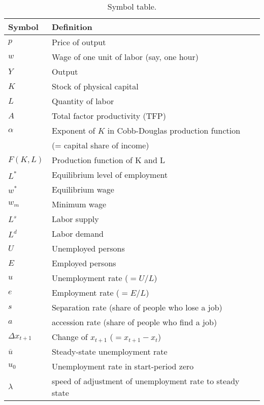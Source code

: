 \begin{table}[htb]
\centering
\caption{Symbol table.}
\begin{tabular*}{0.95\textwidth}{l@{\extracolsep{\fill}}l}
\toprule
Symbol & Definition\\
\midrule
$p$                 &Price of output\\
$w$                    &Wage of one unit of labor (say, one hour)\\
$Y$                 & Output\\
$K$                 & Stock of physical capital \\
$L$                 &    Quantity of labor\\
$A$                            &Total factor productivity (TFP)\\
$\alpha$                     &Exponent of $K$ in Cobb-Douglas   production function \\
                            &(= capital share of income)\\
$F(K,L)$                    &Production function of K and L\\
$L^*$               &Equilibrium level of employment\\
$w^*$                &Equilibrium wage\\
$w_m$                &Minimum wage\\
$L^s$                 &Labor supply\\
$L^d$                 &Labor demand\\
$U$                 &Unemployed persons\\
$E$                 &Employed persons\\
$u$                 &Unemployment rate ($=U/L$)\\
$e$                 &Employment rate ($=E/L$)\\
$s$                 &Separation rate (share of people who lose a job)\\
$a$                 &accession rate
 (share of people who find a job)\\
$\Delta x_{t+1}$    &Change of $x_{t+1}$ ($=x_{t+1}-x_t$)\\
$\overline{u}$          &Steady-state unemployment rate \\
$u_0$                 &Unemployment rate in start-period zero\\
$\lambda$              &speed of adjustment
 of unemployment rate to steady state\\
\bottomrule
\end{tabular*}
\end{table}

